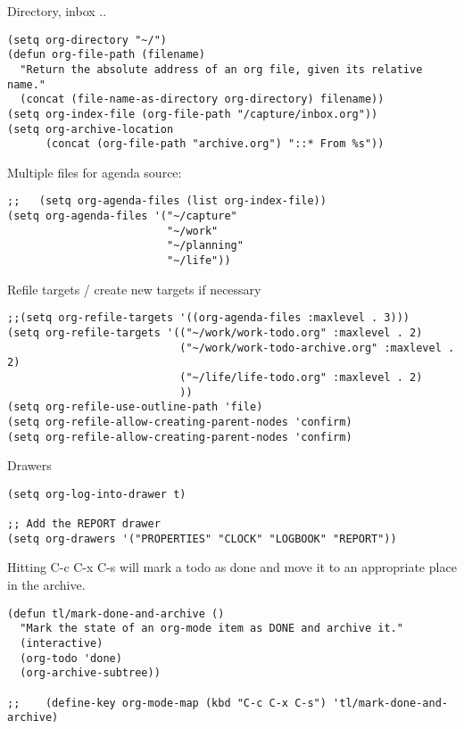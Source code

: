 \documentclass[12pt]{article}
\begin{document}
Directory, inbox ..

\begin{verbatim}
(setq org-directory "~/")
(defun org-file-path (filename)
  "Return the absolute address of an org file, given its relative name."
  (concat (file-name-as-directory org-directory) filename))
(setq org-index-file (org-file-path "/capture/inbox.org"))
(setq org-archive-location
      (concat (org-file-path "archive.org") "::* From %s"))
\end{verbatim}

Multiple files for agenda source:

\begin{verbatim}
;;   (setq org-agenda-files (list org-index-file))
(setq org-agenda-files '("~/capture"
                         "~/work"
                         "~/planning"
                         "~/life"))
\end{verbatim}

Refile targets / create new targets if necessary

\begin{verbatim}
;;(setq org-refile-targets '((org-agenda-files :maxlevel . 3)))
(setq org-refile-targets '(("~/work/work-todo.org" :maxlevel . 2)
                           ("~/work/work-todo-archive.org" :maxlevel . 2)
                           ("~/life/life-todo.org" :maxlevel . 2)
                           ))
(setq org-refile-use-outline-path 'file)
(setq org-refile-allow-creating-parent-nodes 'confirm)
(setq org-refile-allow-creating-parent-nodes 'confirm)
\end{verbatim}

Drawers 
\begin{verbatim}
(setq org-log-into-drawer t)

;; Add the REPORT drawer
(setq org-drawers '("PROPERTIES" "CLOCK" "LOGBOOK" "REPORT"))
\end{verbatim}

Hitting C-c C-x C-s will mark a todo as done and move it to an appropriate place
in the archive.

\begin{verbatim}
(defun tl/mark-done-and-archive ()
  "Mark the state of an org-mode item as DONE and archive it."
  (interactive)
  (org-todo 'done)
  (org-archive-subtree))

;;    (define-key org-mode-map (kbd "C-c C-x C-s") 'tl/mark-done-and-archive)



\end{verbatim}
\end{document}
